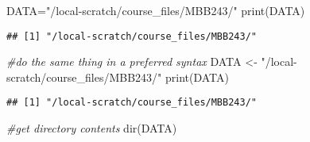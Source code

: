 \documentclass[
]{article}
\newenvironment{Shaded}{\begin{snugshade}}{\end{snugshade}}
\newcommand{\CommentTok}[1]{\textcolor[rgb]{0.56,0.35,0.01}{\textit{#1}}}
\newcommand{\FunctionTok}[1]{\textcolor[rgb]{0.00,0.00,0.00}{#1}}
\newcommand{\NormalTok}[1]{#1}
\newcommand{\OtherTok}[1]{\textcolor[rgb]{0.56,0.35,0.01}{#1}}
\newcommand{\StringTok}[1]{\textcolor[rgb]{0.31,0.60,0.02}{#1}}
\begin{document}
\begin{Shaded}
\begin{Highlighting}[]
\NormalTok{DATA}\OtherTok{=}\StringTok{"/local{-}scratch/course\_files/MBB243/"}
\FunctionTok{print}\NormalTok{(DATA)}
\end{Highlighting}
\end{Shaded}

\begin{verbatim}
## [1] "/local-scratch/course_files/MBB243/"
\end{verbatim}

\begin{Shaded}
\begin{Highlighting}[]
\CommentTok{\#do the same thing in a preferred syntax}
\NormalTok{DATA }\OtherTok{\textless{}{-}} \StringTok{"/local{-}scratch/course\_files/MBB243/"}
\FunctionTok{print}\NormalTok{(DATA)}
\end{Highlighting}
\end{Shaded}

\begin{verbatim}
## [1] "/local-scratch/course_files/MBB243/"
\end{verbatim}

\begin{Shaded}
\begin{Highlighting}[]
\CommentTok{\#get directory contents}
\FunctionTok{dir}\NormalTok{(DATA)}
\end{Highlighting}
\end{Shaded}
\end{document}
